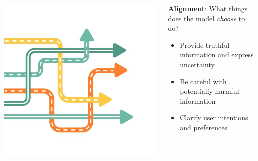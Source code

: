 \documentclass[usenames,dvipsnames,notes,11pt,aspectratio=169,hyperref={colorlinks=true, linkcolor=blue}]{beamer}
\begin{document}
\begin{frame}
        \pause
        \begin{columns}
        \begin{column}{0.3\textwidth}
        \includegraphics[width=\textwidth]{figures/choice}
        \end{column}
        \begin{column}{0.7\textwidth}
    \textbf{Alignment}: What things does the model \emph{choose} to do?
    \begin{itemize}
        \item Provide truthful information and express uncertainty 
        \item Be careful with potentially harmful information  
        \item Clarify user intentions and preferences 
    \end{itemize}
        \end{column}
        \end{columns}
\end{frame}
\end{document}
